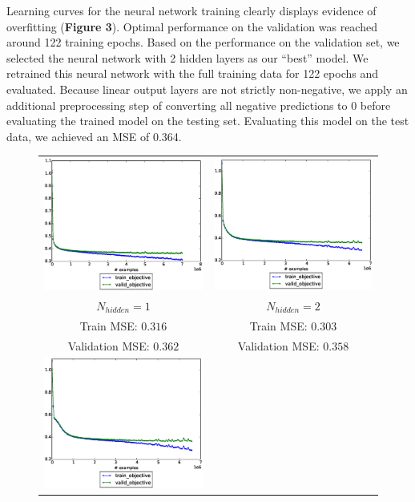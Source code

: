 \documentclass[12pt] {article}
\renewcommand{\baselinestretch}{1.5} %
\begin{document}
Learning curves for the neural network training clearly displays evidence of overfitting (\textbf{Figure 3}). Optimal performance on the validation was reached around 122 training epochs. Based on the performance on the validation set, we selected the neural network with 2 hidden layers as our ``best'' model. We retrained this neural network with the full training data for 122 epochs and evaluated. Because linear output layers are not strictly non-negative, we apply an additional preprocessing step of converting all negative predictions to 0 before evaluating the trained model on the testing set. Evaluating this model on the test data, we achieved an MSE of 0.364.
\renewcommand{\baselinestretch}{1.0} %
\begin{figure}[h!] \centering
\begin{tabular}{cc}
\includegraphics[trim = 0mm 20mm 0mm 10mm, clip=true, width=.45\textwidth]{figdir/nn_mse_1.eps} &
\includegraphics[trim = 0mm 20mm 0mm 10mm, clip=true, width=.45\textwidth]{figdir/nn_mse_2.eps} \\
$N_{hidden}=1$ & $N_{hidden}=2$ \\
Train MSE: $0.316$ & Train MSE: $0.303$ \\
Validation MSE: $0.362$ & Validation MSE: $0.358$ \\
\includegraphics[trim = 0mm 20mm 0mm 10mm, clip=true, width=.45\textwidth]{figdir/nn_mse_3.eps} &

\end{tabular}
\end{figure}
\end{document}
